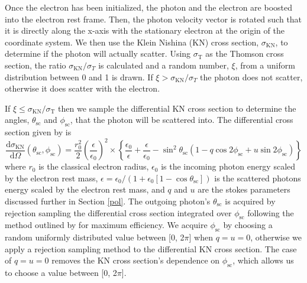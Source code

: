 \documentclass[12pt,a4paper]{article}
\begin{document}
Once the electron has been initialized, the photon and the electron are boosted into the electron rest frame. Then, the photon velocity vector is rotated such that it is directly along the x-axis with the stationary electron at the origin of the coordinate system. We then use the Klein Nishina (KN) cross section, $\sigma_\mathrm{KN}$, to determine if the photon will actually scatter.  Using $\sigma_{\mathrm{T}}$ as the Thomson cross section, the ratio $\sigma_\mathrm{KN}/\sigma_T$ is calculated and a random number, $\xi$, from a uniform distribution between 0 and 1 is drawn. If $\xi >\sigma_\mathrm{KN}/\sigma_T $ the photon does not scatter, otherwise it does scatter with the electron. 

If $\xi \le \sigma_{\mathrm{KN}}/\sigma_{\mathrm{T}}$ then we sample the differential KN cross section to determine the angles, $\theta_{\mathrm{sc}}$ and $\phi_{\mathrm{sc}}$, that the photon will be scattered into. The differential cross section given by \cite{lundman2014polarization} is
\begin{equation}
\frac{\mathrm{d} \sigma_{\mathrm{KN}}}{\mathrm{d} \Omega} (\theta_{\mathrm{sc}}, \phi_{\mathrm{sc}}) =\frac{r_{0}^{2}}{2}\left(\frac{\epsilon}{\epsilon_{0}}\right)^{2} \times 
\left\{\frac{\epsilon_{0}}{\epsilon}+\frac{\epsilon}{\epsilon_{0}} - \sin ^{2} \theta_{\mathrm{sc}}\left(1- q \cos 2 \phi_{\mathrm{sc}}+u \sin 2 \phi_{\mathrm{sc}}\right)\right\} \label{KN_diff_cross_section_scatt}
\end{equation}
where $r_{0}$ is the classical electron radius, $\epsilon_{0}$ is the incoming photon energy scaled by the electron rest mass, $\epsilon=\epsilon_{0}/(1+\epsilon_{0}[1-\cos \theta_{\mathrm{sc}}])$ is the scattered photons energy scaled by the electron rest mass, and $q$ and $u$ are the stokes parameters discussed further in Section \ref{pol}. The outgoing photon's $\theta_{\mathrm{sc}}$ is acquired by rejection sampling the differential cross section integrated over $\phi_{\mathrm{sc}}$ following the method outlined by \cite{sample_kn_theta} for maximum efficiency. We acquire $\phi_{\mathrm{sc}}$ by choosing a random uniformly distributed value between [0, 2$\pi$] when $q=u=0$, otherwise we apply a rejection sampling method to the differential KN cross section. {The case of $q=u=0$ removes the KN cross section's  dependence on $\phi_{\mathrm{sc}}$, which allows us to choose a value between [0, 2$\pi$].}
\end{document}

